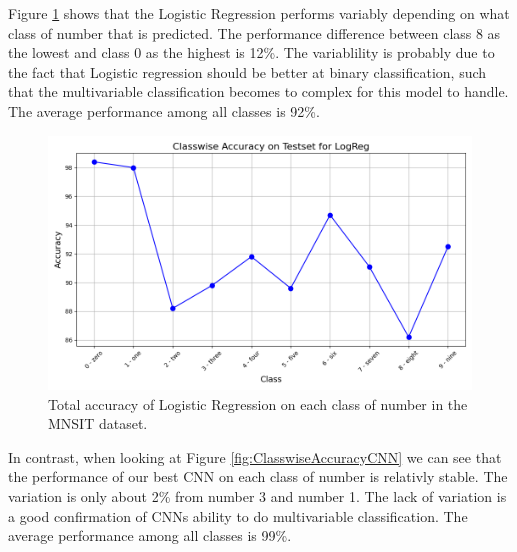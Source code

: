 Figure \ref{fig:ClasswiseAccuracyLogReg} shows that the Logistic Regression performs variably depending on what class of number that is predicted. The performance difference between class 8 as the lowest and class 0 as the highest is 12\%. The variablility is probably due to the fact that Logistic regression should be better at binary classification, such that the multivariable classification becomes to complex for this model to handle. The average performance among all classes is 92\%.

\begin{figure}[H]
    \centering
    \includegraphics[width=\textwidth]{results/evaluation/LogReg_classwise_acc.png}
    \caption{Total accuracy of Logistic Regression on each class of number in the MNSIT dataset.}
    \label{fig:ClasswiseAccuracyLogReg}
\end{figure}

In contrast, when looking at Figure \ref{fig:ClasswiseAccuracyCNN} we can see that the performance of our best CNN on each class of number is relativly stable. The variation is only about 2\% from number 3 and number 1. The lack of variation is a good confirmation of CNNs ability to do multivariable classification. The average performance among all classes is 99\%.


